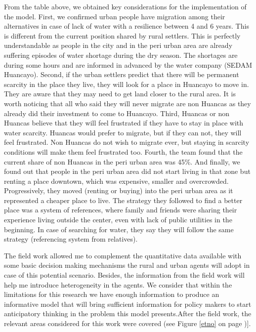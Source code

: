\documentclass{article}
\begin{document}
From the table above, we obtained key considerations for the implementation of the model. First, we confirmed urban people have migration among their alternatives in case of lack of water with a resilience between 4 and 6 years. This is different from the current position shared by rural settlers. This is perfectly understandable as people in the city and in the peri urban area are already suffering episodes of water shortage during the dry season. The shortages are during some hours and are informed in advanced by the water company (SEDAM Huancayo).  Second, if the urban settlers predict that there will be permanent scarcity in the place they live, they will look for a place in Huancayo to move in. They are aware that they may need to get land closer to the rural area. It is worth noticing that all who said they will never migrate are non Huancas as they already did their investment to come to Huancayo. Third,   Huancas or non Huancas  believe that they will feel frustrated if they have to stay in place with water scarcity. Huancas would prefer to migrate, but if they can not, they will feel frustrated. Non Huancas do not wish to migrate ever, but staying in scarcity conditions will make them feel frustrated too. Fourth, the team found that the current share of non Huancas in the peri urban area was 45\%. And finally, we found out that people in the peri urban area did not start living in that zone but renting a place downtown, which was expensive, smaller and overcrowded. Progressively, they moved (renting or buying) into the peri urban area as it represented a cheaper place to live. The strategy they followed to find a better place was a system of references, where family and friends were sharing their experience living outside the center, even with lack of public utilities in the beginning. In case of searching for water, they say they will follow the same strategy (referencing system from relatives).

The field work allowed me to complement the quantitative data available with some basic decision making mechanisms the rural and urban agents will adopt in case of this potential scenario. Besides, the information from the field work will help me introduce heterogeneity in the agents. We consider that within the limitations for this research we have enough information to produce an informative model that will bring sufficient information for policy makers to start anticipatory thinking in the problem this model presents.After the field work, the relevant areas considered for this work were covered (see Figure \ref{etno} on page \pageref{etno})]. 
\end{document}
